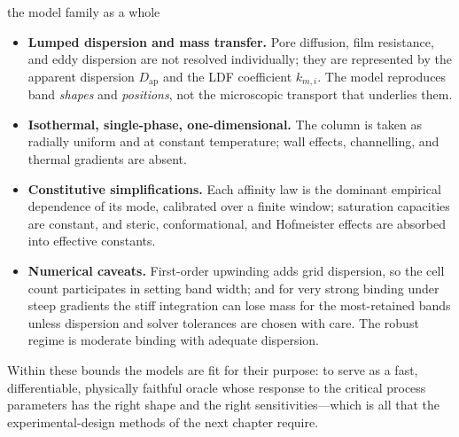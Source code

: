 \begin{limitbox}{the model family as a whole}
\begin{itemize}
  \item \textbf{Lumped dispersion and mass transfer.} Pore diffusion, film
  resistance, and eddy dispersion are not resolved individually; they are
  represented by the apparent dispersion $D_{\mathrm{ap}}$ and the LDF
  coefficient $k_{m,i}$. The model reproduces band \emph{shapes} and
  \emph{positions}, not the microscopic transport that underlies them.
  \item \textbf{Isothermal, single-phase, one-dimensional.} The column is taken
  as radially uniform and at constant temperature; wall effects, channelling,
  and thermal gradients are absent.
  \item \textbf{Constitutive simplifications.} Each affinity law is the dominant
  empirical dependence of its mode, calibrated over a finite window; saturation
  capacities are constant, and steric, conformational, and Hofmeister effects
  are absorbed into effective constants.
  \item \textbf{Numerical caveats.} First-order upwinding adds grid dispersion,
  so the cell count participates in setting band width; and for very strong
  binding under steep gradients the stiff integration can lose mass for the
  most-retained bands unless dispersion and solver tolerances are chosen with
  care. The robust regime is moderate binding with adequate dispersion.
\end{itemize}
Within these bounds the models are fit for their purpose: to serve as a fast,
differentiable, physically faithful oracle whose response to the critical
process parameters has the right shape and the right sensitivities---which is all
that the experimental-design methods of the next chapter require.
\end{limitbox}
